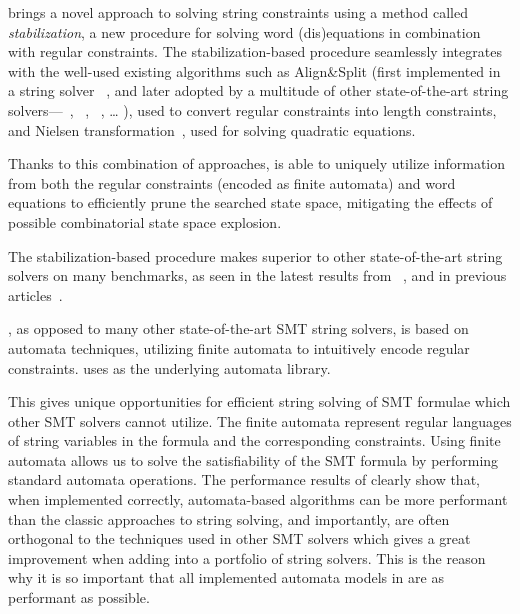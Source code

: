 \noodler brings a novel approach to solving string constraints using a method called \emph{stabilization}, a new procedure for solving word (dis)equations in combination with regular constraints.
The stabilization-based procedure seamlessly integrates with the well-used existing algorithms such as
Align\&Split (first implemented in a string solver \norn~\cite{Norn,AutomataSplitting}, and later adopted by a multitude of other state-of-the-art string solvers---\ostrich~\cite{AnthonyTowards2016,AnthonyReplaceAll2018,AnthonyComplex2019,AnthonyRegex2022,AnthonyInteger2020},
\ziiistriiire~\cite{Z3str3RE,BerzishDGKMMN23}, \sloth~\cite{holik_string_2018}, \ldots
), used to convert regular constraints into length constraints, and
Nielsen transformation~\cite{nielsen1917}, used for solving quadratic equations.

Thanks to this combination of approaches, \noodler is able to uniquely utilize information from both the regular constraints (encoded as finite automata) and word equations to efficiently prune the searched state space, mitigating the effects of possible combinatorial state space explosion.

The stabilization-based procedure makes \noodler superior to other state-of-the-art string solvers on many benchmarks, as seen in the latest results from \noodler~\cite{tacas24_noodler_10.1007/978-3-031-57246-3_2}, and in previous articles~\cite{fm23_equations_synergy_regular_constraints_DBLP:conf/fm/BlahoudekCCHHLS23, oopsla23_stabilization_DBLP:journals/pacmpl/ChenCHHLS23}.

\noodler, as opposed to many other state-of-the-art SMT string solvers, is based on automata techniques, utilizing finite automata to intuitively encode regular constraints.
\noodler uses \mata as the underlying automata library.

This gives \noodler unique opportunities for efficient string solving of SMT formulae which other SMT solvers cannot utilize.
The finite automata represent regular languages of string variables in the formula and the corresponding constraints.
Using finite automata allows us to solve the satisfiability of the SMT formula by performing standard automata operations.
The performance results of \noodler clearly show that, when implemented correctly, automata-based algorithms can be more performant than the classic approaches to string solving, and importantly, are often orthogonal to the techniques used in other SMT solvers which gives a great improvement when adding \noodler into a portfolio of string solvers.
This is the reason why it is so important that all implemented automata models in \mata are as performant as possible.

